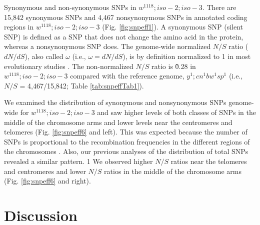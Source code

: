 
Synonymous and non-synonymous SNPs in $w^{1118} ; iso-2; iso-3$. There are 15,842 synonymous SNPs and 4,467 nonsynonymous SNPs in annotated coding regions in $w^{1118} ; iso-2; iso-3$ (Fig. \ref{fig:snpeff1}). A synonymous SNP (silent SNP) is defined as a SNP that does not change the amino acid in the protein, whereas a nonsynonymous SNP does. The genome-wide normalized $N/S$ ratio ($dN/dS$), also called $\omega$ (i.e., $\omega = dN/dS$), is by definition normalized to 1 in most evolutionary studies \cite{stoletzki2011positive}. The non-normalized $N/S$ ratio is \~0.28 in $w^{1118} ; iso-2; iso-3$ compared with the reference genome, $y^1 ; cn^1 bw^1 sp^1$ (i.e., $N/S$ = 4,467/15,842; Table \ref{tab:snpeffTab1}).

We examined the distribution of synonymous and nonsynonymous SNPs genome-wide for $w^{1118} ; iso-2; iso-3$ and saw higher levels of both classes of SNPs in the middle of the chromosome arms and lower levels near the centromeres and telomeres (Fig. \ref{fig:snpeff6} and left). This was expected because the number of SNPs is proportional to the recombination frequencies in the different regions of the chromosomes \cite{begun1992levels,charlesworth1987relative}. Also, our previous analyses of the distribution of total SNPs revealed a similar pattern. 1 We observed higher $N/S$ ratios near the telomeres and centromeres and lower $N/S$ ratios in the middle of the chromosome arms (Fig. \ref{fig:snpeff6} and right).

\section{Discussion}

